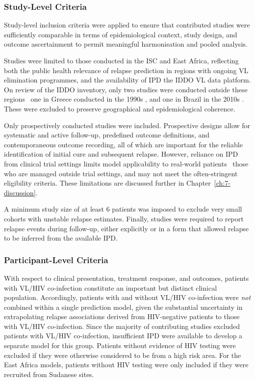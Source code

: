 \subsubsection{Study-Level Criteria}

Study-level inclusion criteria were applied to ensure that contributed studies were sufficiently comparable in terms of epidemiological context, study design, and outcome ascertainment to permit meaningful harmonisation and pooled analysis.

Studies were limited to those conducted in the ISC and East Africa, reflecting both the public health relevance of relapse prediction in regions with ongoing VL elimination programmes, and the availability of IPD the IDDO VL data platform. On review of the IDDO inventory\cite{iddo2025vlinventory}, only two studies were conducted outside these regions \textemdash\ one in Greece conducted in the 1990s \cite{syriopoulou2003}, and one in Brazil in the 2010s \cite{romero2017}. These were excluded to preserve geographical and epidemiological coherence.

Only prospectively conducted studies were included. Prospective designs allow for systematic and active follow-up, predefined outcome definitions, and contemporaneous outcome recording, all of which are important for the reliable identification of initial cure and subsequent relapse. However, reliance on IPD from clinical trial settings limits model applicability to real-world patients \textemdash\ those who are managed outside trial settings, and may not meet the often-stringent eligibility criteria. These limitations are discussed further in Chapter~\ref{ch:7-discussion}.

A minimum study size of at least 6 patients was imposed to exclude very small cohorts with unstable relapse estimates. Finally, studies were required to report relapse events during follow-up, either explicitly or in a form that allowed relapse to be inferred from the available IPD.

\subsubsection{Participant-Level Criteria}

With respect to clinical presentation, treatment response, and outcomes, patients with VL/HIV co-infection constitute an important but distinct clinical population. Accordingly, patients with and without VL/HIV co-infection were \textit{not} combined within a single prediction model, given the substantial uncertainty in extrapolating relapse associations derived from HIV-negative patients to those with VL/HIV co-infection. Since the majority of contributing studies excluded patients with VL/HIV co-infection, insufficient IPD were available to develop a separate model for this group. Patients without evidence of HIV testing were excluded if they were otherwise considered to be from a high risk area. For the East Africa models, patients without HIV testing were only included if they were recruited from Sudanese sites.

